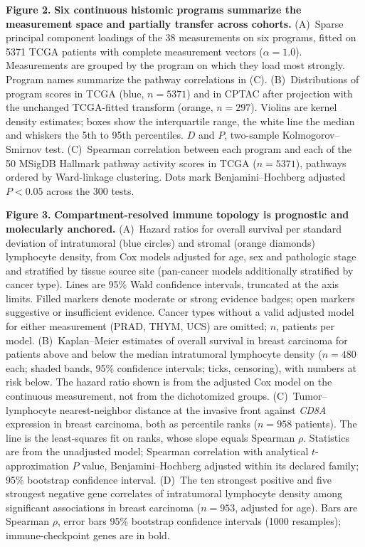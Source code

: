 \label{fig:fig2}
\noindent\textbf{Figure 2.} \textbf{Six continuous histomic programs summarize the measurement 
space and partially transfer across cohorts.} 
(A)~Sparse principal component loadings of the 38 measurements on six programs, 
fitted on \num{5371} TCGA patients with complete measurement vectors 
($\alpha = 1.0$). Measurements are grouped by the program on which they load 
most strongly. Program names summarize the pathway correlations in (C). 
(B)~Distributions of program scores in TCGA (blue, $n = \num{5371}$) and in 
CPTAC after projection with the unchanged TCGA-fitted transform (orange, 
$n = 297$). Violins are kernel density estimates; boxes show the interquartile 
range, the white line the median and whiskers the 5th to 95th percentiles. 
$D$ and $P$, two-sample Kolmogorov--Smirnov test. 
(C)~Spearman correlation between each program and each of the 50 MSigDB 
Hallmark pathway activity scores in TCGA ($n = \num{5371}$), pathways ordered by 
Ward-linkage clustering. Dots mark Benjamini--Hochberg adjusted $P < 0.05$ 
across the 300 tests.
\par\medskip

\label{fig:fig3}
\noindent\textbf{Figure 3.} \textbf{Compartment-resolved immune topology is prognostic and 
molecularly anchored.} 
(A)~Hazard ratios for overall survival per standard deviation of intratumoral 
(blue circles) and stromal (orange diamonds) lymphocyte density, from Cox models 
adjusted for age, sex and pathologic stage and stratified by tissue source site 
(pan-cancer models additionally stratified by cancer type). Lines are 95\% Wald 
confidence intervals, truncated at the axis limits. Filled markers denote 
moderate or strong evidence badges; open markers suggestive or insufficient 
evidence. Cancer types without a valid adjusted model for either measurement 
(PRAD, THYM, UCS) are omitted; $n$, patients per model. 
(B)~Kaplan--Meier estimates of overall survival in breast carcinoma for patients 
above and below the median intratumoral lymphocyte density ($n = 480$ each; 
shaded bands, 95\% confidence intervals; ticks, censoring), with numbers at risk 
below. The hazard ratio shown is from the adjusted Cox model on the continuous 
measurement, not from the dichotomized groups. 
(C)~Tumor--lymphocyte nearest-neighbor distance at the invasive front against 
\textit{CD8A} expression in breast carcinoma, both as percentile ranks 
($n = 958$ patients). The line is the least-squares fit on ranks, whose slope 
equals Spearman $\rho$. Statistics are from the unadjusted model; Spearman 
correlation with analytical $t$-approximation $P$ value, Benjamini--Hochberg 
adjusted within its declared family; 95\% bootstrap confidence interval. 
(D)~The ten strongest positive and five strongest negative gene correlates of 
intratumoral lymphocyte density among significant associations in breast 
carcinoma ($n = 953$, adjusted for age). Bars are Spearman $\rho$, error bars 
95\% bootstrap confidence intervals (\num{1000} resamples); immune-checkpoint 
genes are in bold.
\par\medskip

